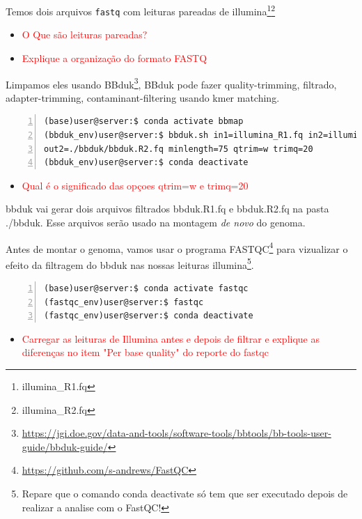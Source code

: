 \documentclass[letter,11pt]{book}
\begin{document}
Temos dois arquivos \Verb+fastq+ com leituras pareadas de illumina\footnote{illumina\_R1.fq}\footnote{illumina\_R2.fq}

\begin{itemize}
\item \textcolor{red}{O Que são leituras pareadas?}
\item \textcolor{red}{Explique a organização do formato FASTQ}
\end{itemize}

Limpamos eles usando BBduk\footnote{\url{https://jgi.doe.gov/data-and-tools/software-tools/bbtools/bb-tools-user-guide/bbduk-guide/}}, BBduk pode fazer quality-trimming, filtrado, adapter-trimming, contaminant-filtering usando kmer matching.

\begin{Verbatim}[commandchars=!\{\}, numbers=left,label= Limpando leituras Illumina com bbduk,frame=topline,fontsize=\scriptsize]
(base)user@server:$ conda activate bbmap
(bbduk_env)user@server:$ bbduk.sh in1=illumina_R1.fq in2=illumina_R2.fq out1=./bbduk/bbduk.R1.fq \
out2=./bbduk/bbduk.R2.fq minlength=75 qtrim=w trimq=20
(bbduk_env)user@server:$ conda deactivate
\end{Verbatim}


\begin{itemize}
\item \textcolor{red}{Qual é o significado das opçoes qtrim=w e trimq=20}
\end{itemize}


bbduk vai gerar dois arquivos filtrados bbduk.R1.fq e bbduk.R2.fq na pasta ./bbduk. Esse arquivos serão usado na montagem \emph{de novo} do genoma.

Antes de montar o genoma, vamos usar o programa FASTQC\footnote{\url{https://github.com/s-andrews/FastQC}} para vizualizar o efeito da filtragem do bbduk nas nossas leituras illumina\footnote{Repare que o comando conda deactivate só tem que ser executado depois de realizar a analise com o FastQC!}.

\begin{Verbatim}[commandchars=!\{\}, numbers=left,label= Abrindo o FASTQC,frame=topline,fontsize=\scriptsize]
(base)user@server:$ conda activate fastqc 
(fastqc_env)user@server:$ fastqc
(fastqc_env)user@server:$ conda deactivate
\end{Verbatim}

\begin{itemize}
\item \textcolor{red}{Carregar as leituras de Illumina antes e depois de filtrar e explique as diferenças no item "Per base quality" do reporte do fastqc}
\end{itemize}
\end{document}
